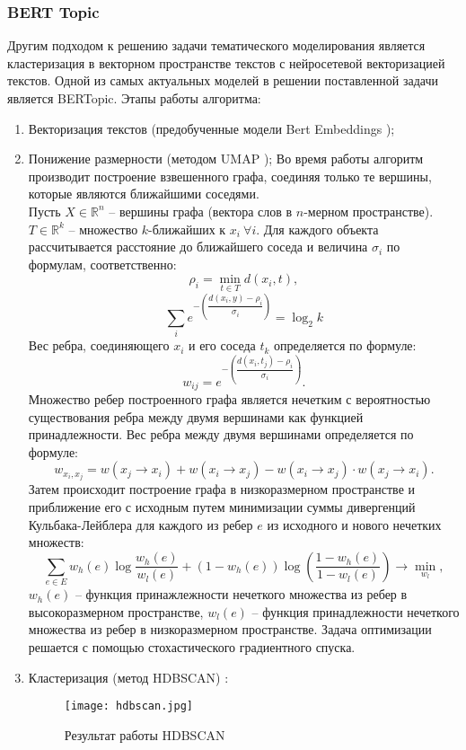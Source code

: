 \subsubsection{BERT Topic} 
Другим подходом к решению задачи тематического моделирования является кластеризация в векторном пространстве текстов с нейросетевой векторизацией текстов. Одной из самых актуальных моделей в решении поставленной задачи является BERTopic. Этапы работы алгоритма:
\begin{enumerate}
    \item Векторизация текстов (предобученные модели Bert Embeddings \cite{bert});
    \item Понижение размерности (методом UMAP \cite{leland});
    Во время работы алгоритм производит построение взвешенного графа, соединяя только те вершины, которые являются ближайшими соседями.\\ Пусть $X \in \mathbb{R}^n$ -- вершины графа (вектора слов в $n$-мерном пространстве). $T \in \mathbb{R}^{k}$ -- множество $k$-ближайших к $x_i \ \forall i$. Для каждого объекта рассчитывается расстояние до ближайшего соседа и величина $\sigma_i$ по формулам, соответственно:
    \[\rho_i = \min\limits_{t\in T} d(x_i, t),\]
    \[\sum\limits_{i}e^{-\left(\dfrac{d(x_i,y) - \rho_i}{\sigma_i}\right)} = \log_2 k\]
    Вес ребра, соединяющего $x_i$ и его соседа $t_k$ определяется по формуле:
    \[w_{ij} = e^{-\left(\dfrac{d(x_i, t_j) - \rho_i}{\sigma_i}\right)}.\] 
    Множество ребер построенного графа является нечетким с вероятностью существования ребра между двумя вершинами как функцией принадлежности. Вес ребра между двумя вершинами определяется по формуле:
    \[w_{x_i, x_j} = w(x_j \to x_i) + w(x_i \to x_j) - w(x_i \to x_j) \cdot w(x_j\to x_i).\] 
    Затем происходит построение графа в низкоразмерном пространстве и приближение его с исходным путем минимизации суммы дивергенций Кульбака-Лейблера для каждого из ребер $e$ из исходного и нового нечетких множеств:
    \[\sum\limits_{e \in E} w_h(e) \log \dfrac{w_h(e)}{w_l(e)} + (1-w_h(e))\log\left(\dfrac{1-w_h(e)}{1-w_l(e)}\right) \to \min\limits_{w_l},\]
    $w_h(e)$ -- функция принажлежности нечеткого множества из ребер в высокоразмерном пространстве, $w_l(e)$ -- функция принадлежности нечеткого множества из ребер в низкоразмерном пространстве. Задача оптимизации решается с помощью стохастического градиентного спуска.
    \item Кластеризация (метод HDBSCAN) \cite{clustering}:
    \begin{figure}[H]
        \centering
        \texttt{[image: hdbscan.jpg]}
        \caption{Результат работы HDBSCAN}
        \label{fig:hdbscan}
    \end{figure}
\end{enumerate}
